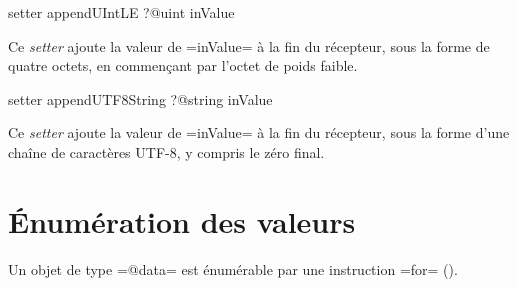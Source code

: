 
\begin{galgas}
setter appendUIntLE ?@uint inValue
\end{galgas}

Ce \emph{setter} ajoute la valeur de \ggs=inValue= à la fin du récepteur, sous la forme de quatre octets, en commençant par l'octet de poids faible.












\begin{galgas}
setter appendUTF8String ?@string inValue
\end{galgas}

Ce \emph{setter} ajoute la valeur de \ggs=inValue= à la fin du récepteur, sous la forme d'une chaîne de caractères UTF-8, y compris le zéro final.


\section{Énumération des valeurs}

Un objet de type \ggs=@data= est énumérable par une instruction \ggs=for= ().
